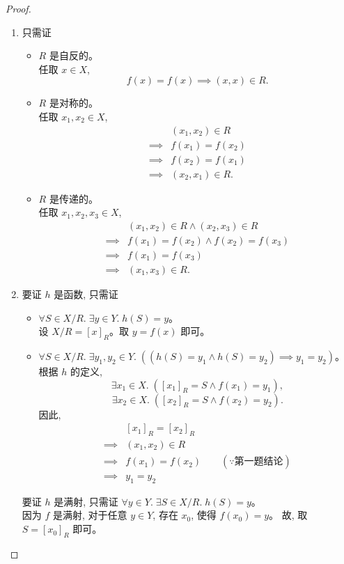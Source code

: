 \documentclass[a4paper, justified]{tufte-handout}
\begin{document}
\begin{proof}
  \begin{enumerate}[(1)]
    \item 只需证
      \begin{itemize}
        \item $R$ 是自反的。\\
          任取 $x \in X$,
          \[
            f(x) = f(x) \implies (x, x) \in R.
          \]
        \item $R$ 是对称的。\\
          任取 $x_{1}, x_{2} \in X$,
          \begin{align*}
            & (x_{1}, x_{2}) \in R \\
            \implies & f(x_{1}) = f(x_{2}) \\
            \implies & f(x_{2}) = f(x_{1}) \\
            \implies & (x_{2}, x_{1}) \in R.
          \end{align*}
        \item $R$ 是传递的。\\
          任取 $x_{1}, x_{2}, x_{3} \in X$,
          \begin{align*}
            & (x_{1}, x_{2}) \in R \land (x_{2}, x_{3}) \in R \\
            \implies & f(x_{1}) = f(x_{2}) \land f(x_{2}) = f(x_{3}) \\
            \implies & f(x_{1}) = f(x_{3}) \\
            \implies & (x_{1}, x_{3}) \in R.
          \end{align*}
      \end{itemize}
    \item 要证 $h$ 是函数, 只需证
      \begin{itemize}
        \item $\forall S \in X/R.\; \exists y \in Y.\; h(S) = y$。\\
          设 $X/R = [x]_{R}$。取 $y = f(x)$ 即可。
        \item $\forall S \in X/R.\; \exists y_{1}, y_{2} \in Y.\;
          ((h(S) = y_{1} \land h(S) = y_{2}) \implies y_{1} = y_{2})$。\\
          根据 $h$ 的定义,
          \[
            \exists x_{1} \in X.\; ([x_{1}]_{R} = S \land f(x_{1}) = y_{1}),
          \]
          \[
            \exists x_{2} \in X.\; ([x_{2}]_{R} = S \land f(x_{2}) = y_{2}).
          \]
          因此,
          \begin{align*}
            & [x_{1}]_{R} = [x_{2}]_{R} \\
            \implies & (x_{1}, x_{2}) \in R \\
            \implies & f(x_{1}) = f(x_{2}) \qquad (\because \text{第一题结论}) \\
            \implies & y_{1} = y_{2}
          \end{align*}
      \end{itemize}
      要证 $h$ 是满射, 只需证 $\forall y \in Y.\; \exists S \in X/R.\; h(S) = y$。\\
      因为 $f$ 是满射, 对于任意 $y \in Y$, 存在 $x_{0}$, 使得 $f(x_{0}) = y$。
      故, 取 $S = [x_{0}]_{R}$ 即可。
  \end{enumerate}
\end{proof}
\end{document}
